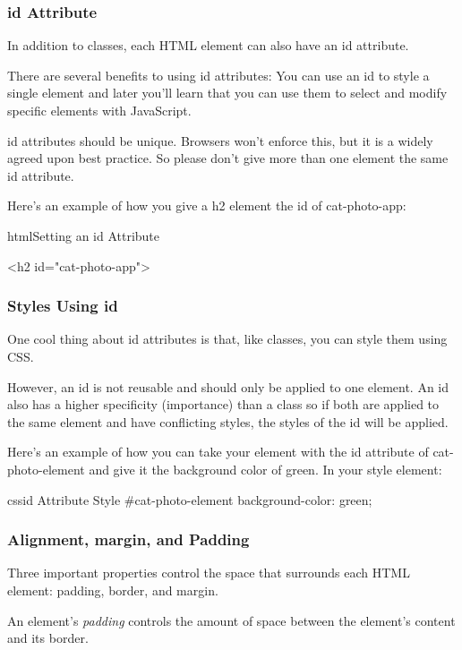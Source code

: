 \subsubsection{id Attribute}
In addition to classes, each HTML element can also have an id attribute.

There are several benefits to using id attributes: You can use an id to style a single element and later you'll learn that you can use them to select and modify specific elements with JavaScript.

id attributes should be unique. Browsers won't enforce this, but it is a widely agreed upon best practice. So please don't give more than one element the same id attribute.

Here's an example of how you give a h2 element the id of cat-photo-app:

\begin{codeBlock}{html}{Setting an id Attribute}

<h2 id="cat-photo-app">
\end{codeBlock}

\subsubsection{Styles Using id}
One cool thing about id attributes is that, like classes, you can style them using CSS.

However, an id is not reusable and should only be applied to one element. An id also has a higher specificity (importance) than a class so if both are applied to the same element and have conflicting styles, the styles of the id will be applied.

Here's an example of how you can take your element with the id attribute of cat-photo-element and give it the background color of green. In your style element:
\begin{codeBlock}{css}{id Attribute Style}
#cat-photo-element {
  background-color: green;
}
\end{codeBlock}

\subsubsection{Alignment, margin, and Padding}
Three important properties control the space that surrounds each HTML element: padding, border, and margin.

An element's \emph{padding} controls the amount of space between the element's content and its border.

